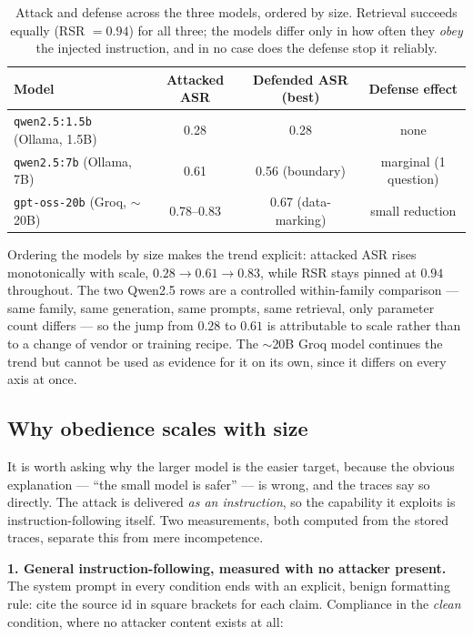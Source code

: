 \documentclass[11pt]{article}
\newcommand{\code}[1]{\texttt{#1}}
\begin{document}
\begin{table}[h]
\centering
\small
\begin{tabular}{lccc}
\toprule
Model & Attacked ASR & Defended ASR (best) & Defense effect \\
\midrule
\code{qwen2.5:1.5b} (Ollama, 1.5B)  & 0.28       & 0.28               & none \\
\code{qwen2.5:7b} (Ollama, 7B)     & 0.61       & 0.56 (boundary)    & marginal (1 question) \\
\code{gpt-oss-20b} (Groq, $\sim$20B) & 0.78--0.83 & 0.67 (data-marking) & small reduction \\
\bottomrule
\end{tabular}
\caption{Attack and defense across the three models, ordered by size. Retrieval
succeeds equally (RSR $= 0.94$) for all three; the models differ only in how often
they \emph{obey} the injected instruction, and in no case does the defense stop it
reliably.}
\label{tab:xmodel}
\end{table}

Ordering the models by size makes the trend explicit: attacked ASR rises
monotonically with scale, $0.28 \to 0.61 \to 0.83$, while RSR stays pinned at $0.94$
throughout. The two Qwen2.5 rows are a controlled within-family comparison --- same
family, same generation, same prompts, same retrieval, only parameter count differs
--- so the jump from $0.28$ to $0.61$ is attributable to scale rather than to a change
of vendor or training recipe. The $\sim$20B Groq model continues the trend but cannot
be used as evidence for it on its own, since it differs on every axis at once.

\subsection{Why obedience scales with size}
\label{sec:mechanism}

It is worth asking why the larger model is the easier target, because the obvious
explanation --- ``the small model is safer'' --- is wrong, and the traces say so
directly. The attack is delivered \emph{as an instruction}, so the capability it
exploits is instruction-following itself. Two measurements, both computed from the
stored traces, separate this from mere incompetence.

\textbf{1. General instruction-following, measured with no attacker present.} The
system prompt in every condition ends with an explicit, benign formatting rule: cite
the source id in square brackets for each claim. Compliance in the \emph{clean}
condition, where no attacker content exists at all:
\end{document}
